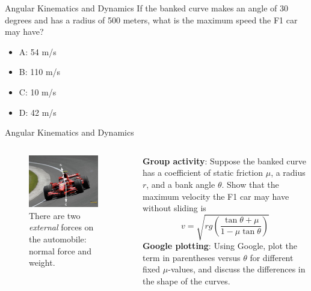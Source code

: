 \documentclass{beamer}
\begin{document}
\begin{frame}{Angular Kinematics and Dynamics}
If the banked curve makes an angle of 30 degrees and has a radius of 500 meters, what is the maximum speed the F1 car may have?
\begin{itemize}
\item A: 54 m/s
\item B: 110 m/s
\item C: 10 m/s
\item D: 42 m/s
\end{itemize}
\end{frame}

\begin{frame}{Angular Kinematics and Dynamics}
\begin{columns}[T]
\begin{column}{0.5\textwidth}
\begin{figure}
\centering
\includegraphics[width=0.9\textwidth]{figures/ferari.pdf}
\caption{\label{fig:ferari2} There are two \alert{\textit{external}} forces on the automobile: normal force and weight.}
\end{figure}
\end{column}
\begin{column}{0.5\textwidth}
\small
\textbf{Group activity}: Suppose the banked curve has a coefficient of static friction $\mu$, a radius $r$, and a bank angle $\theta$.  Show that the maximum velocity the F1 car may have without sliding is 
\begin{equation}
v = \sqrt{rg\left(\frac{\tan\theta+\mu}{1-\mu\tan\theta}\right)}
\end{equation}
\textbf{Google plotting}: Using Google, plot the term in parentheses versus $\theta$ for different fixed $\mu$-values, and discuss the differences in the shape of the curves.
\end{column}
\end{columns}
\end{frame}
\end{document}
